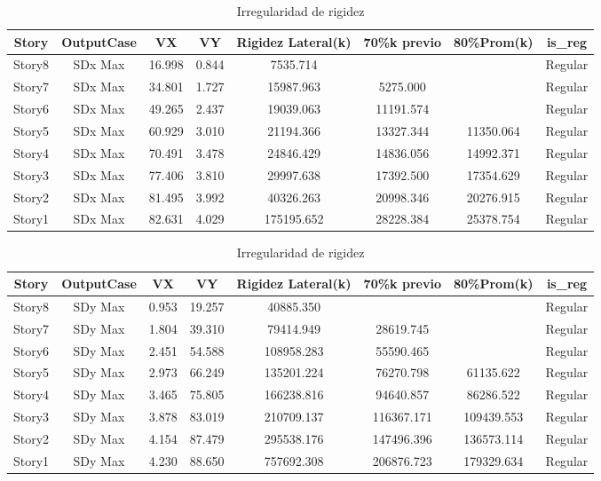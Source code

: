 \documentclass{article}%
\begin{document}
\begin{table}[h!]%
\centering%
\caption{Irregularidad de rigidez}%
\begin{tabular}{cccccccc}
\toprule
Story & OutputCase & VX & VY & Rigidez Lateral(k) & 70\%k previo & 80\%Prom(k) & is\_reg \\
\midrule
Story8 & SDx Max & 16.998 & 0.844 & 7535.714 &  &  & Regular \\
Story7 & SDx Max & 34.801 & 1.727 & 15987.963 & 5275.000 &  & Regular \\
Story6 & SDx Max & 49.265 & 2.437 & 19039.063 & 11191.574 &  & Regular \\
Story5 & SDx Max & 60.929 & 3.010 & 21194.366 & 13327.344 & 11350.064 & Regular \\
Story4 & SDx Max & 70.491 & 3.478 & 24846.429 & 14836.056 & 14992.371 & Regular \\
Story3 & SDx Max & 77.406 & 3.810 & 29997.638 & 17392.500 & 17354.629 & Regular \\
Story2 & SDx Max & 81.495 & 3.992 & 40326.263 & 20998.346 & 20276.915 & Regular \\
Story1 & SDx Max & 82.631 & 4.029 & 175195.652 & 28228.384 & 25378.754 & Regular \\
\bottomrule
\end{tabular}
%
\end{table}

%


\begin{table}[h!]%
\centering%
\caption{Irregularidad de rigidez}%
\begin{tabular}{cccccccc}
\toprule
Story & OutputCase & VX & VY & Rigidez Lateral(k) & 70\%k previo & 80\%Prom(k) & is\_reg \\
\midrule
Story8 & SDy Max & 0.953 & 19.257 & 40885.350 &  &  & Regular \\
Story7 & SDy Max & 1.804 & 39.310 & 79414.949 & 28619.745 &  & Regular \\
Story6 & SDy Max & 2.451 & 54.588 & 108958.283 & 55590.465 &  & Regular \\
Story5 & SDy Max & 2.973 & 66.249 & 135201.224 & 76270.798 & 61135.622 & Regular \\
Story4 & SDy Max & 3.465 & 75.805 & 166238.816 & 94640.857 & 86286.522 & Regular \\
Story3 & SDy Max & 3.878 & 83.019 & 210709.137 & 116367.171 & 109439.553 & Regular \\
Story2 & SDy Max & 4.154 & 87.479 & 295538.176 & 147496.396 & 136573.114 & Regular \\
Story1 & SDy Max & 4.230 & 88.650 & 757692.308 & 206876.723 & 179329.634 & Regular \\
\bottomrule
\end{tabular}
%
\end{table}
\end{document}
